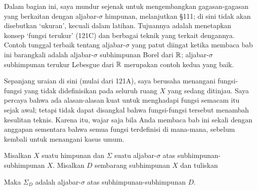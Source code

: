 
\def\chaptername{Integrasi}
\def\sectionname{Fungsi terukur}


Dalam bagian ini, saya mundur sejenak untuk mengembangkan gagasan-gagasan
yang berkaitan dengan aljabar-$\sigma$ himpunan, melanjutkan \S111; di
sini tidak akan disebutkan `ukuran', kecuali dalam latihan. Tujuannya
adalah menetapkan konsep `fungsi terukur' (121C) dan berbagai teknik
yang terkait dengannya.
Contoh tunggal terbaik tentang aljabar-$\sigma$ yang patut diingat ketika
membaca bab ini barangkali adalah aljabar-$\sigma$ subhimpunan Borel dari
$\Bbb R$; aljabar-$\sigma$ subhimpunan terukur Lebesgue
dari $\Bbb R$ merupakan contoh kedua yang baik.

Sepanjang uraian di sini (mulai dari 121A), saya berusaha menangani
fungsi-fungsi yang tidak didefinisikan pada seluruh ruang $X$ yang
sedang ditinjau. Saya percaya bahwa ada alasan-alasan kuat untuk
menghadapi fungsi semacam itu sejak awal; tetapi
tidak dapat disangkal bahwa fungsi-fungsi tersebut menambah kesulitan
teknis. Karena itu, wajar saja bila Anda membaca bab ini sekali dengan
anggapan sementara bahwa semua fungsi terdefinisi di mana-mana, sebelum
kembali untuk menangani kasus umum.


 Misalkan $X$ suatu himpunan dan $\Sigma$ suatu
aljabar-$\sigma$ atas subhimpunan-subhimpunan $X$. Misalkan $D$
sembarang subhimpunan $X$ dan tuliskan


\noindent Maka $\Sigma_D$ adalah aljabar-$\sigma$ atas
subhimpunan-subhimpunan $D$.


